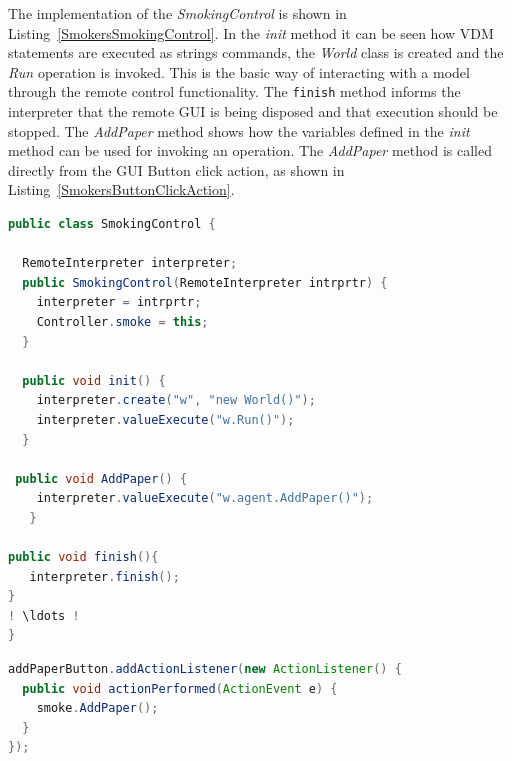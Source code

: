 \documentclass{overturerepchap}
\begin{document}
The implementation of the \textit{SmokingControl} is shown in Listing~\ref{SmokersSmokingControl}. In the \textit{init} method it can be seen how VDM statements are executed as strings commands, the \textit{World} class is created and the \textit{Run} operation is invoked.  This is the basic way of interacting with a model through the remote control functionality. The \texttt{finish} method informs the interpreter that the remote GUI is being disposed and that execution should be stopped. The \textit{AddPaper} method shows how the variables defined in the \textit{init} method can be used for invoking an operation. The \textit{AddPaper} method is called directly from the GUI Button click action, as shown in Listing~\ref{SmokersButtonClickAction}.

\begin{lstlisting}[language=Java,label=SmokersSmokingControl,caption=Java implementation of the bridge between the GUI and the interpreter executing the VDM model, captionpos=b]
public class SmokingControl {
  
  RemoteInterpreter interpreter;
  public SmokingControl(RemoteInterpreter intrprtr) {
    interpreter = intrprtr;
    Controller.smoke = this;
  }
  	
  public void init() {
    interpreter.create("w", "new World()");	
    interpreter.valueExecute("w.Run()");
  }

 public void AddPaper() {
    interpreter.valueExecute("w.agent.AddPaper()");
   }

public void finish(){
   interpreter.finish();
}
! \ldots !
}
\end{lstlisting}

\begin{lstlisting}[language=Java,label=SmokersButtonClickAction,caption=Java implementation of the Button click action invoking the remote intepreter, captionpos=b]
addPaperButton.addActionListener(new ActionListener() {
  public void actionPerformed(ActionEvent e) {	
    smoke.AddPaper();
  }
});	
\end{lstlisting}
\end{document}
